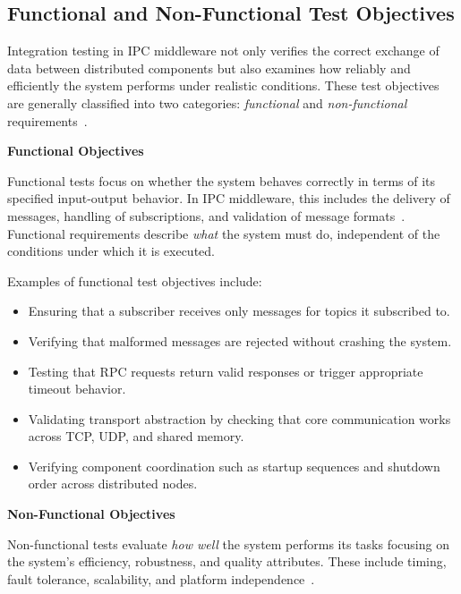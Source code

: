 \newpage

\subsection{Functional and Non-Functional Test Objectives}

Integration testing in IPC middleware not only verifies the correct exchange of data between distributed components but also examines how reliably and efficiently the system performs under realistic conditions. These test objectives are generally classified into two categories: \textit{functional} and \textit{non-functional} requirements~\cite{gorton2006software, tanenbaum2017, spillner2019softwaretest}.

\vspace{1em}
\textbf{Functional Objectives}

\vspace{0.4em}
Functional tests focus on whether the system behaves correctly in terms of its specified input-output behavior. In IPC middleware, this includes the delivery of messages, handling of subscriptions, and validation of message formats~\cite{burnstein2003practical, spillner2019softwaretest}. Functional requirements describe \textit{what} the system must do, independent of the conditions under which it is executed.

\vspace{1em}
Examples of functional test objectives include:

\begin{itemize}
	\item Ensuring that a subscriber receives only messages for topics it subscribed to.
	\item Verifying that malformed messages are rejected without crashing the system.
	\item Testing that RPC requests return valid responses or trigger appropriate timeout behavior.
	\item Validating transport abstraction by checking that core communication works across TCP, UDP, and shared memory.
	\item Verifying component coordination such as startup sequences and shutdown order across distributed nodes.
\end{itemize}

\vspace{1em}
\textbf{Non-Functional Objectives}

\vspace{0.4em}
Non-functional tests evaluate \textit{how well} the system performs its tasks focusing on the system’s efficiency, robustness, and quality attributes. These include timing, fault tolerance, scalability, and platform independence~\cite{stallings2018, spillner2019softwaretest}.

